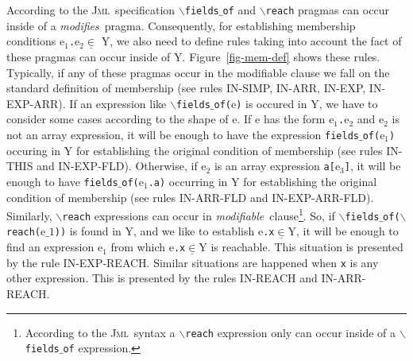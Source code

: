 \documentclass[a4paper]{llncs}
\newcommand{\jml}{\textsc{Jml}}
\newcommand{\modif}{\textit{modifiable}}
\newcommand{\modifies}{\textit{modifies}}
\begin{document}
According to the \jml~specification
\texttt{$\backslash$fields}$\_$\texttt{of} and
\texttt{$\backslash$reach} pragmas can occur inside of a
\modifies~pragma. Consequently, for establishing membership conditions
\textup{e}$_1$\texttt{.}\textup{e}$_2$$\underline\in$ \textsc{Y}, we
also need
to define rules taking into account the fact of these pragmas can
occur inside of \textsc{Y}. Figure~\ref{fig-mem-def} shows these
rules. Typically, if any of these pragmas occur in the modifiable
clause we fall on the standard definition of membership (see rules
\textup{IN-SIMP},  \textup{IN-ARR}, \textup{IN-EXP},
\textup{IN-EXP-ARR}). If an expression
like
$\backslash$\texttt{fields}$\_$\texttt{of(}\textup{e}\texttt{)} is
occured in \textsc{Y}, we
have to consider some cases according to the shape of \textup{e}. If
\textup{e} has the form \textup{e}$_1$\texttt{.}\textup{e}$_2$ and
\textup{e}$_2$ is not an array expression, it will be enough to have
the expression \texttt{fields$\_$of(}\textup{e}$_1$\texttt{)} occuring 
in \textsc{Y} for 
establishing the original condition of membership (see rules
\textup{IN-THIS} and \textup{IN-EXP-FLD}). Otherwise, if
\textup{e}$_2$ is an array expression
\texttt{a[}\textup{e}$_3$\texttt{]}, 
it will be enough to have
\texttt{fields$\_$of(}\textup{e}$_1$\texttt{.a}\texttt{)} occurring in
\textsc{Y} for establishing the original condition of membership
(see rules \textup{IN-ARR-FLD} and
\textup{IN-EXP-ARR-FLD}). Similarly, $\backslash$\texttt{reach}
expressions can occur in \modif~clause\footnote{According to the
\jml~syntax a
$\backslash$\texttt{reach} expression only can occur inside of a
$\backslash$\texttt{fields}$\_$\texttt{of} expression.}. So, if
$\backslash$\texttt{fields}$\_$\texttt{of($\backslash$reach(}\textup{e}$\_1$\texttt{))}
is found in \textsc{Y}, and we like to establish
\textup{e}\texttt{.x}$\underline\in$\textsc{Y}, it will be enough to
find an expression \textup{e}$_1$ from which
\textup{e}\texttt{.x}$\underline\in$\textsc{Y} is reachable. This
situation is presented by the rule \textup{IN-EXP-REACH}. Similar
situations are happened when \texttt{x} is any other expression. This
is presented by the rules \textup{IN-REACH} and
\textup{IN-ARR-REACH}. 
\end{document}
